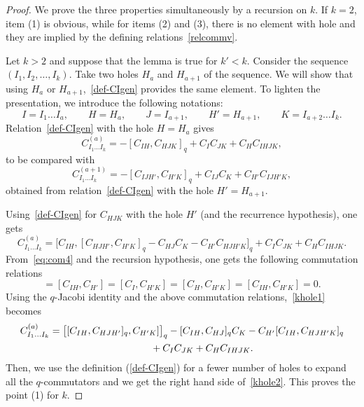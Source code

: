 \documentclass[pdftex]{sigma}
\numberwithin{equation}{section}
\theoremstyle{definition}
\begin{document}
\begin{proof}
We prove the three properties simultaneously by a recursion on $k$.
If $k=2$, item (1) is obvious, while for items (2) and (3), there is no element with hole and they are implied by the defining relations~\eqref{relcommv}.

Let $k>2$ and suppose that the lemma is true for $k'\!<k$. Consider the sequence $(I_1,I_2,\dots, I_{k})$.
Take two holes $H_a$ and $H_{a+1}$ of the sequence. We will show that using $H_a$ or $H_{a+1}$,~\eqref{def-CIgen} provides the same element.
To lighten the presentation, we introduce the following notations:
\begin{equation*}
 I=I_1\dots I_a ,\qquad H=H_a ,\qquad J=I_{a+1} ,\qquad H'=H_{a+1} ,\qquad K=I_{a+2}\dots I_k .
\end{equation*}
Relation~\eqref{def-CIgen} with the hole $H=H_a$ gives
\begin{equation*}
C^{(a)}_{I_1\dots I_k}=-[C_{IH},C_{HJK}]_q+C_{I}C_{JK}+C_{H}C_{IHJK} ,
\end{equation*}
to be compared with
\begin{equation}\label{khole2}
C^{(a+1)}_{I_1\dots I_k}=-[C_{IJH'},C_{H'K}]_q+ C_{IJ}C_{K}+C_{H'}C_{IJH'K} ,
\end{equation}
obtained from relation~\eqref{def-CIgen} with the hole $H'=H_{a+1}$.

Using~\eqref{def-CIgen} for $C_{HJK}$ with the hole $H'$ (and the recurrence hypothesis), one gets
\begin{equation}\label{khole1}
C^{(a)}_{I_1\dots I_k}=\big[C_{IH},[C_{HJH'},C_{H'K}]_q-C_{HJ}C_{K}-C_{H'}C_{HJH'K}\big]_q+C_{I}C_{JK}+C_{H}C_{IHJK} .
\end{equation}
From~\eqref{eq:com4} and the recursion hypothesis, one gets the following commutation relations
\begin{equation*}
 [C_{IH},C_{K}]=[C_{IH},C_{H'}]=[C_{I},C_{H'K}]=[C_{H},C_{H'K}]=[C_{IH},C_{H'K}]=0 .
\end{equation*}
Using the $q$-Jacobi identity and the above commutation relations,~\eqref{khole1} becomes
\begin{gather*}%
C^{(a)}_{I_1\dots I_k}=\big[[C_{IH},C_{HJH'}]_q,C_{H'K}]\big]_q -[C_{IH},C_{HJ}]_q C_{K}-C_{H'}[C_{IH},C_{HJH'K}]_q \\
\hphantom{C^{(a)}_{I_1\dots I_k}=}{}+C_{I}C_{JK}+C_{H}C_{IHJK} .
\end{gather*}
Then, we use the definition (\ref{def-CIgen}) for a fewer number of holes to expand all the $q$-commutators
and we get the right hand side of~\eqref{khole2}. This proves the point (1) for $k$.


\end{proof}
\end{document}
